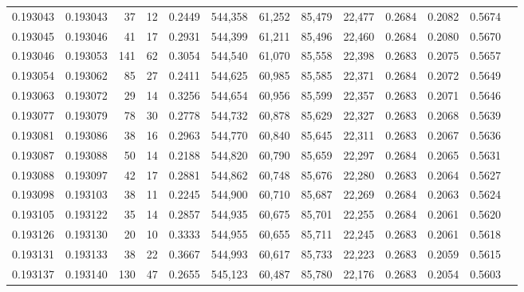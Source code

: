 \begin{tabular}{rrrrrrrrrrrrr}
0.193043 & 0.193043 &    37 &  12 &                                     0.2449 & 544,358 &  61,252 &  85,479 &  22,477 & 0.2684 & 0.2082 & 0.5674 \\
0.193045 & 0.193046 &    41 &  17 &                                     0.2931 & 544,399 &  61,211 &  85,496 &  22,460 & 0.2684 & 0.2080 & 0.5670 \\
0.193046 & 0.193053 &   141 &  62 &                                     0.3054 & 544,540 &  61,070 &  85,558 &  22,398 & 0.2683 & 0.2075 & 0.5657 \\
0.193054 & 0.193062 &    85 &  27 &                                     0.2411 & 544,625 &  60,985 &  85,585 &  22,371 & 0.2684 & 0.2072 & 0.5649 \\
0.193063 & 0.193072 &    29 &  14 &                                     0.3256 & 544,654 &  60,956 &  85,599 &  22,357 & 0.2683 & 0.2071 & 0.5646 \\
0.193077 & 0.193079 &    78 &  30 &                                     0.2778 & 544,732 &  60,878 &  85,629 &  22,327 & 0.2683 & 0.2068 & 0.5639 \\
0.193081 & 0.193086 &    38 &  16 &                                     0.2963 & 544,770 &  60,840 &  85,645 &  22,311 & 0.2683 & 0.2067 & 0.5636 \\
0.193087 & 0.193088 &    50 &  14 &                                     0.2188 & 544,820 &  60,790 &  85,659 &  22,297 & 0.2684 & 0.2065 & 0.5631 \\
0.193088 & 0.193097 &    42 &  17 &                                     0.2881 & 544,862 &  60,748 &  85,676 &  22,280 & 0.2683 & 0.2064 & 0.5627 \\
0.193098 & 0.193103 &    38 &  11 &                                     0.2245 & 544,900 &  60,710 &  85,687 &  22,269 & 0.2684 & 0.2063 & 0.5624 \\
0.193105 & 0.193122 &    35 &  14 &                                     0.2857 & 544,935 &  60,675 &  85,701 &  22,255 & 0.2684 & 0.2061 & 0.5620 \\
0.193126 & 0.193130 &    20 &  10 &                                     0.3333 & 544,955 &  60,655 &  85,711 &  22,245 & 0.2683 & 0.2061 & 0.5618 \\
0.193131 & 0.193133 &    38 &  22 &                                     0.3667 & 544,993 &  60,617 &  85,733 &  22,223 & 0.2683 & 0.2059 & 0.5615 \\
0.193137 & 0.193140 &   130 &  47 &                                     0.2655 & 545,123 &  60,487 &  85,780 &  22,176 & 0.2683 & 0.2054 & 0.5603 \\

\end{tabular}
